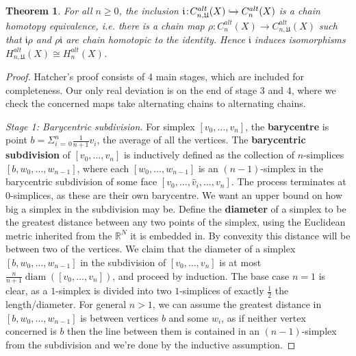 \documentclass[11pt,a4paper,twoside]{article}
\theoremstyle{plain}
\newtheorem{thm}{Theorem}[subsection]
\theoremstyle{definition}
\theoremstyle{definition}
\theoremstyle{definition}
\theoremstyle{definition}
\theoremstyle{definition}
\DeclareMathOperator{\diam}{diam}
\begin{document}
\vspace{2mm}
\begin{thm}
\label{Thm:OpenCoverChainGroups}
For all $n\!\geq\!0$, the inclusion $\mathfrak{i}\!:\!C_{n,\mathfrak{U}}^{alt}(X)\xhookrightarrow{}C_n^{alt}(X)$ is a chain homotopy equivalence, i.e. there is a chain map $\rho\!:\!C_n^{alt}(X)\!\longrightarrow\!C_{n,\mathfrak{U}}^{alt}(X)$ such that $\mathfrak{i}\rho$ and $\rho\mathfrak{i}$ are chain homotopic to the identity. Hence $\mathfrak{i}$ induces isomorphisms $H_{n,\mathfrak{U}}^{alt}(X)\cong H_n^{alt}(X)$.
\end{thm}
\begin{proof}
Hatcher's proof consists of 4 main stages, which are included for completeness. Our only real deviation is on the end of stage $3$ and $4$, where we check the concerned maps take alternating chains to alternating chains.

\emph{Stage 1: Barycentric subdivision.} For simplex $[v_0,\dots,v_n]$, the \textbf{barycentre} is point $b=\Sigma_{i\,=\,0}^{n}\frac1{n\!+\!1}v_i$, the average of all the vertices. The \textbf{barycentric subdivision} of $[v_0,\dots,v_n]$ is inductively defined as the collection of $n$-simplices $[b,w_0,\dots,w_{n\!-\!1}]$, where each $[w_0,\dots,w_{n\!-\!1}]$ is an $(n\!-\!1)$-simplex in the barycentric subdivision of some face $[v_0,\dots,\hat{v}_i,\dots,v_n]$. The process terminates at $0$-simplices, as these are their own barycentre. We want an upper bound on how big a simplex in the subdivision may be. Define the \textbf{diameter} of a simplex to be the greatest distance between any two points of the simplex, using the Euclidean metric inherited from the  $\mathbb{R}^N$ it is embedded in. By convexity this distance will be between two of the vertices. We claim that the diameter of a simplex $[b,w_0,\dots,w_{n\!-\!1}]$ in the subdivision of $[v_0,\dots,v_n]$ is at most $\frac{n}{n\!+\!1}\diam([v_0,\dots,v_n])$, and proceed by induction. The base case $n\!=\!1$ is clear, as a $1$-simplex is divided into two $1$-simplices of exactly $\frac12$ the length/diameter. For general $n\!>\!1$, we can assume the greatest distance in $[b,w_0,\dots,w_{n\!-\!1}]$ is between vertices $b$ and some $w_i$, as if neither vertex concerned is $b$ then the line between them is contained in an $(n\!-\!1)$-simplex from the subdivision and we're done by the inductive assumption.


\end{proof}
\end{document}

